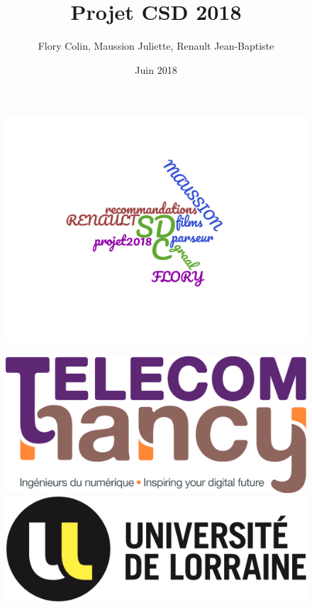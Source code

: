 \documentclass{article}
\title{Projet CSD 2018 }
\author{Flory Colin, Maussion Juliette, Renault Jean-Baptiste}
\date{Juin 2018}
\begin{document}
\begin{titlepage}

    \begin{figure}
        \centering
        \includegraphics[scale=0.3]{titre.png}
        \label{fig:titre}
    \end{figure}
    \maketitle
    \thispagestyle{empty}
    \begin{figure}
   \begin{minipage}[c]{.46\linewidth}
      \includegraphics[scale=0.05]{logo_TNCY.png}
   \end{minipage} \hfill
   \begin{minipage}[c]{.46\linewidth}
      \includegraphics[scale=0.13]{LogoUnivLorraine.png}
   \end{minipage}
\end{figure}
    
\end{titlepage}
\end{document}

